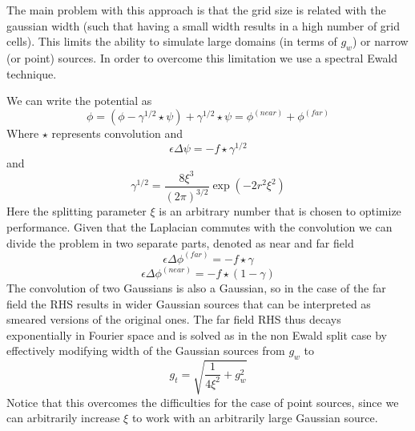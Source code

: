 \documentclass[ twoside,openright,titlepage,numbers=noenddot,%
headinclude,footinclude,cleardoublepage=empty,abstract=on,
BCOR=5mm,paper=a4,fontsize=11pt, dvipsnames
]{scrreprt}
\begin{document}
The main problem with this approach is that the grid size is related with the gaussian width (such that having a small width results in a high number of grid cells). This limits the ability to simulate large domains (in terms of $g_w$) or narrow (or point) sources. In order to overcome this limitation we use a spectral Ewald technique.

We can write the potential as  
\begin{equation}
 \phi=(\phi - \gamma^{1/2}\star\psi) + \gamma^{1/2}\star\psi = \phi^{(near)} + \phi^{(far)}
\end{equation}  
Where  $\star$ represents convolution and
 \begin{equation}
 \epsilon\Delta\psi=-f\star\gamma^{1/2}
\end{equation}   
and  
 \begin{equation}
 \gamma^{1/2} = \frac{8\xi^3}{(2\pi)^{3/2}}\exp\left(-2r^2\xi^2\right)
\end{equation}   
Here the splitting parameter $\xi$ is an arbitrary number that is chosen to optimize performance. 
Given that the Laplacian commutes with the convolution we can divide the problem in two separate parts, denoted as near and far field  
 \begin{equation}
 \epsilon\Delta\phi^{(far)}=-f\star\gamma
\end{equation}   
\begin{equation}
 \label{tppoisson_ewald_near}
 \epsilon\Delta\phi^{(near)}=-f\star(1-\gamma)
\end{equation}   
The convolution of two Gaussians is also a Gaussian, so in the case of the far field the RHS results in wider Gaussian sources that can be interpreted as smeared versions of the original ones. The far field RHS thus decays exponentially in Fourier space and is solved as in the non Ewald split case by effectively modifying width of the Gaussian sources from $g_w$ to
\begin{equation}
  g_t = \sqrt{\frac{1}{4\xi^2} + g_w^2}
\end{equation}
Notice that this overcomes the difficulties for the case of point sources, since we can arbitrarily increase $\xi$ to work with an arbitrarily large Gaussian source.
\end{document}
